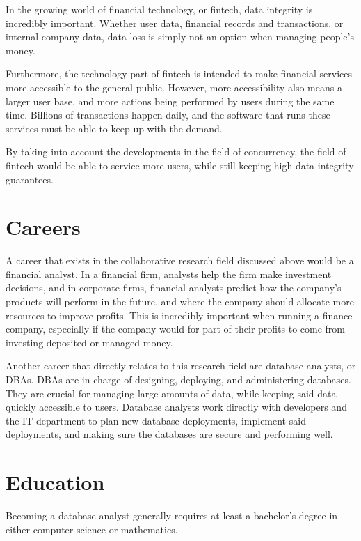 \documentclass[jou]{apa7}
\begin{document}
In the growing world of financial technology, or fintech,
data integrity is incredibly important.
Whether user data, financial records and transactions, or internal company data,
data loss is simply not an option when managing people's money.

Furthermore, the technology part of fintech is intended to make financial services more accessible to the general public.
However, more accessibility also means a larger user base,
and more actions being performed by users during the same time.
Billions of transactions happen daily,
and the software that runs these services must be able to keep up with the demand.
\autocite{foggSoftwareTestingFintech2020}

By taking into account the developments in the field of concurrency,
the field of fintech would be able to service more users,
while still keeping high data integrity guarantees.

\section{Careers}
A career that exists in the collaborative research field discussed above would be a financial analyst.
In a financial firm, analysts help the firm make investment decisions,
and in corporate firms,
financial analysts predict how the company's products will perform in the future,
and where the company should allocate more resources to improve profits.
This is incredibly important when running a finance company,
especially if the company would for part of their profits to come from investing deposited or managed money.
\autocite{segalBecomingFinancialAnalyst2020}

Another career that directly relates to this research field are database analysts, or DBAs.
DBAs are in charge of designing, deploying, and administering databases.
They are crucial for managing large amounts of data,
while keeping said data quickly accessible to users.
Database analysts work directly with developers and the IT department to plan new database deployments,
implement said deployments,
and making sure the databases are secure and performing well.
\autocite{jobheroDatabaseAnalystJob2020}

\section{Education}
Becoming a database analyst generally requires at least a bachelor's degree in either computer science or mathematics.
\autocite{governmentofcanadaDatabaseAnalystCanada2020}
\end{document}

